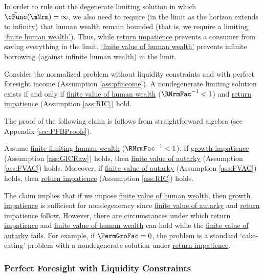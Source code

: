 \documentclass[BufferStockTheory]{subfiles}
\begin{document}
In order to rule out the degenerate limiting solution in which $\bar{\cFunc}(\mNrm) = \infty$, we also need to require (in the limit as the horizon extends to infinity) that human wealth remain bounded (that is, we require a limiting \hyperlink{FHWC}{`finite human wealth'}).  Thus, while \hyperlink{RIC}{return impatience} prevents a consumer from saving everything in the limit,  \hyperlink{FHWC}{`finite value of human wealth'} prevents infinite borrowing (against infinite human wealth) in the limit. 


\begin{proposition}\label{prop:pfUCFHWC}
Consider the normalized problem without liquidity constraints and with perfect foresight income (Assumption \ref{ass:pfincome}). A nondegenerate limiting solution exists if and only if \hyperlink{FHWC}{finite value of human wealth} ($\RNrmFac^{-1}<1$) and \hyperlink{RIC}{return impatience} (Assumption \ref{ass:RIC}) hold. 
\end{proposition}

The proof of the following claim is follows from straightforward algebra (see Appendix \ref{sec:PFBProofs}). 

\begin{claim}\label{claim:PFConspC}
Assume \hyperlink{FHWC}{finite limiting human wealth} ($\RNrmFac^{-1}<1$). If \hyperlink{GICRaw}{growth impatience} (Assumption \ref{ass:GICRaw}) holds, then \hyperlink{FVAC}{finite value of autarky} (Assumption \ref{ass:FVAC}) holds. Moreover, if \hyperlink{FVAC}{finite value of autarky} (Assumption \ref{ass:FVAC}) holds, then \hyperlink{RIC}{return impatience} (Assumption \ref{ass:RIC}) holds. 
\end{claim}



The claim implies that if we impose \hyperlink{FHWC}{finite value of human wealth}, then  \hyperlink{GRICRaw}{growth impatience} is sufficient for nondegeneracy since \hyperlink{FVAC}{finite value of autarky} and \hyperlink{RIC}{return impatience} follow. However, there are circumstances under which \hyperlink{RIC}{return impatience} and \hyperlink{FHWC}{finite value of human wealth} can hold while the \hyperlink{FVAC}{finite value of autarky} fails.  For example, if $\PermGroFac=0$, the problem is a standard `cake-eating' problem with a nondegenerate solution under \hyperlink{RIC}{return impatience}.%

\subsubsection{Perfect Foresight with Liquidity Constraints}
\end{document}

